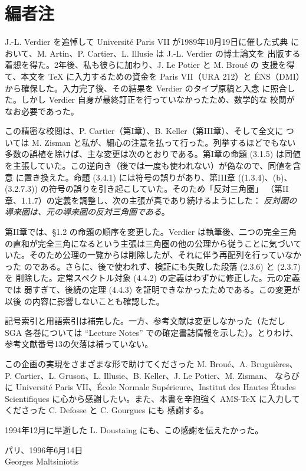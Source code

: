 \clearpage
{}
\chapter*{編者注}

J.-L. Verdier を追悼して Université Paris VII が1989年10月19日に催した式典
において、M. Artin、P. Cartier、L. Illusie は J.-L. Verdier の博士論文を
出版する着想を得た。2年後、私も彼らに加わり、J. Le Potier と M. Broué の
支援を得て、本文を \TeX{} に入力するための資金を Paris VII（URA 212）と
ÉNS（DMI）から確保した。入力完了後、その結果を Verdier のタイプ原稿と入念
に照合した。しかし Verdier 自身が最終訂正を行っていなかったため、数学的な
校閲がなお必要であった。

この精密な校閲は、P. Cartier（第I章）、B. Keller（第III章）、そして全文に
ついては M. Zisman と私が、細心の注意を払って行った。列挙するほどでもない
多数の誤植を除けば、主な変更は次のとおりである。第I章の命題 (3.1.5) は同値
を主張していた。この逆向き（後では一度も使われない）が偽なので、同値を含意
に置き換えた。命題 (3.4.1) には符号の誤りがあり、第III章 ((1.3.4)、(b)、
(3.2.7.3)) の符号の誤りを引き起こしていた。そのため「反対三角圏」
（第II章、1.1.7）の定義を調整し、次の主張が真であり続けるようにした：
\emph{反対圏の導来圏は、元の導来圏の反対三角圏である}。

第II章では、§1.2 の命題の順序を変更した。Verdier は執筆後、二つの完全三角
の直和が完全三角になるという主張は三角圏の他の公理から従うことに気づいて
いた。そのため公理の一覧からは削除したが、それに伴う再配列を行っていなかった
のである。さらに、後で使われず、検証にも失敗した段落 (2.3.6) と (2.3.7) を
削除した。定常スペクトル対象 (4.4.2) の定義はわずかに修正した。元の定義では
弱すぎて、後続の定理 (4.4.3) を証明できなかったためである。この変更が以後
の内容に影響しないことも確認した。

\clearpage
{}
記号索引と用語索引は補完した。一方、参考文献は変更しなかった（ただし SGA
各巻については ``Lecture Notes'' での確定書誌情報を示した）。とりわけ、
参考文献番号13の欠落は補っていない。

この企画の実現をさまざまな形で助けてくださった M. Broué、A. Bruguières、
P. Cartier、L. Gruson、L. Illusie、B. Keller、J. Le Potier、M. Zisman、
ならびに Université Paris VII、École Normale Supérieure、Institut des
Hautes Études Scientifiques に心から感謝したい。また、本書を辛抱強く
\textsc{AMS}-\TeX{} に入力してくださった C. Defosse と C. Gourgues にも
感謝する。

1994年12月に早逝した L. Doustaing にも、この感謝を伝えたかった。

\begin{flushright}
パリ、1996年6月14日\\
Georges Maltsiniotis
\end{flushright}
